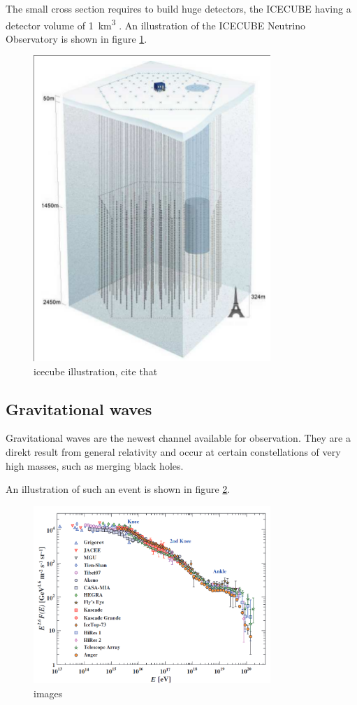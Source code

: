 The small cross section requires to build huge detectors, 
the ICECUBE having a detector volume of \SI{1}{\kilo\meter^3}
\cite{Abbasi:2008aa}.
An illustration of the ICECUBE Neutrino Observatory
is shown in figure \ref{fig:icecube}.
\begin{figure}
	\centering
	\includegraphics[width=0.8\textwidth]{images/icecube.png}
	\caption{icecube illustration, cite that \cite{Abbasi:2008aa}}
	\label{fig:icecube}
\end{figure}

\subsection{Gravitational waves}
Gravitational waves are the newest channel available for observation.
They are a direkt result from general relativity and occur
at certain constellations of very high masses, such as 
merging black holes.

An illustration of such an event is shown in figure \ref{fig:gravi_waves}. 
\begin{figure}
	\centering
	\includegraphics[width=0.8\textwidth]{images/cr_spectrum.png}
	\caption{images}
	\label{fig:gravi_waves}
\end{figure}


